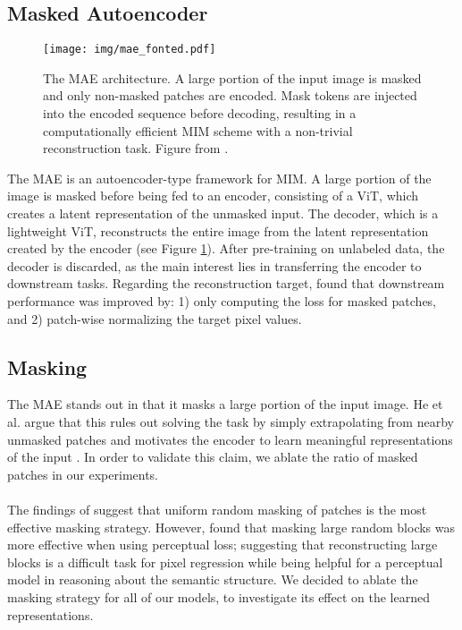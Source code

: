 \subsection{Masked Autoencoder}
\begin{figure}[H]
    \centering
    \texttt{[image: img/mae\_fonted.pdf]}
    \vspace{-1mm}
    \caption{The MAE architecture. A large portion of the input image is masked and only non-masked patches are encoded. Mask tokens are injected into the encoded sequence before decoding, resulting in a computationally efficient MIM scheme with a non-trivial reconstruction task. Figure from \cite{mae}.}
    \label{fig:mae}
\end{figure}
The MAE is an autoencoder-type framework for MIM. A large portion of the image is masked before being fed to an encoder, consisting of a ViT, which creates a latent representation of the unmasked input. The decoder, which is a lightweight ViT, reconstructs the entire image from the latent representation created by the encoder (see Figure \ref{fig:mae}). After pre-training on unlabeled data, the decoder is discarded, as the main interest lies in transferring the encoder to downstream tasks. Regarding the reconstruction target, \cite{mae} found that downstream performance was improved by: 1) only computing the loss for masked patches, and 2) patch-wise normalizing the target pixel values.

\subsection{Masking}
The MAE stands out in that it masks a large portion of the input image. He et al. argue that this rules out solving the task by simply extrapolating from nearby unmasked patches and motivates the encoder to learn meaningful representations of the input \cite{mae}. In order to validate this claim, we ablate the ratio of masked patches in our experiments.
\\\\
The findings of \cite{mae} suggest that uniform random masking of patches is the most effective masking strategy. However, \cite{bootmae} found that masking large random blocks was more effective when using perceptual loss; suggesting that reconstructing large blocks is a difficult task for pixel regression while being helpful for a perceptual model in reasoning about the semantic structure. We decided to ablate the masking strategy for all of our models, to investigate its effect on the learned representations. 

